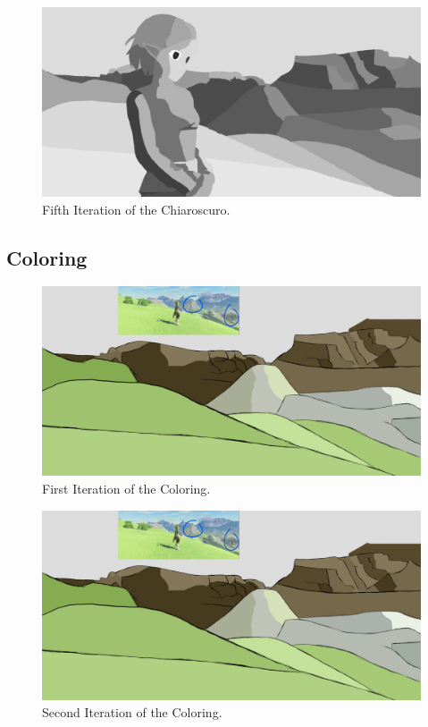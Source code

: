 \documentclass{cup-pan}
\begin{document}
        \begin{figure}[H]
            \includegraphics[width=\textwidth]{Fanart3/2_Claroscuro/IIIII_Claroscuro.png}
            \caption{Fifth Iteration of the Chiaroscuro.}
        \end{figure}

    \subsection{Coloring}

        \begin{figure}[H]
            \includegraphics[width=\textwidth]{Fanart3/3_Color/I_Color.png}
            \caption{First Iteration of the Coloring.}
        \end{figure}

        \begin{figure}[H]
            \includegraphics[width=\textwidth]{Fanart3/3_Color/I_Color.png}
            \caption{Second Iteration of the Coloring.}
        \end{figure}
\end{document}
